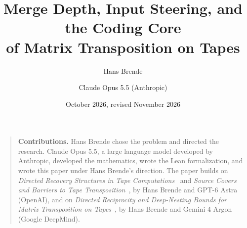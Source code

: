 \documentclass[11pt]{article}
\title{Merge Depth, Input Steering, and the Coding Core\\ of Matrix Transposition on Tapes}
\author{Hans Brende \and Claude Opus 5.5 (Anthropic)}
\date{October 2026, revised November 2026}
\begin{document}
\maketitle

\begin{abstract}

\end{abstract}

\begin{quote}\small
\textbf{Contributions.} Hans Brende chose the problem and directed the research. Claude Opus 5.5, a large language model
developed by Anthropic, developed the mathematics, wrote the Lean formalization, and wrote this paper under Hans Brende's
direction. The paper builds on \emph{Directed Recovery Structures in Tape Computations}~\cite{DirectedRecovery2026} and
\emph{Source Covers and Barriers to Tape Transposition}~\cite{SourceCovers2026}, by Hans Brende and GPT-6 Astra (OpenAI),
and on \emph{Directed Reciprocity and Deep-Nesting Bounds for Matrix Transposition on Tapes}~\cite{DirectedReciprocity2026},
by Hans Brende and Gemini 4 Argon (Google DeepMind).
\end{quote}

\tableofcontents
\clearpage











\appendix




\end{document}
